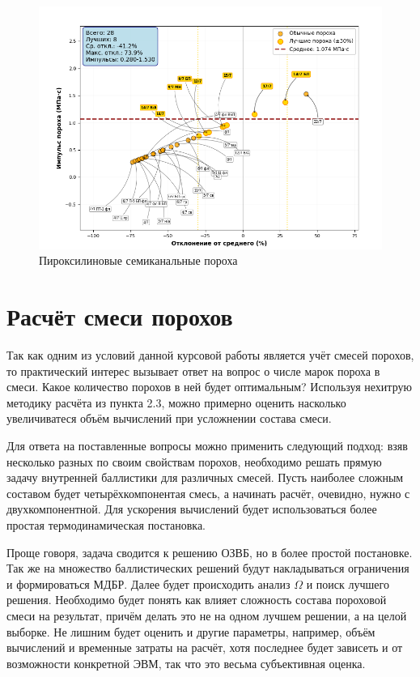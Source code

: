 \documentclass[14pt, a4paper]{extreport} %
\begin{document}
\begin{figure}[H]
\centering
\includegraphics[width=0.6\textheight]{imgs/kaif4.png}
\caption{Пироксилиновые семиканальные пороха}
\end{figure}


\section{Расчёт смеси порохов}

Так как одним из условий данной курсовой работы является учёт смесей порохов, то практический интерес вызывает ответ на вопрос о числе марок пороха в смеси. Какое количество порохов в ней будет оптимальным?
Используя нехитрую методику расчёта из пункта 2.3, можно примерно оценить насколько увеличиватеся объём вычислений при усложнении состава смеси. 

Для ответа на поставленные вопросы можно применить следующий подход: взяв несколько разных по своим свойствам порохов, необходимо решать прямую задачу внутренней баллистики 
для различных смесей. Пусть наиболее сложным составом будет четырёхкомпонентая смесь, а начинать расчёт, очевидно, нужно с двухкомпонентной. Для ускорения вычислений будет использоваться более простая термодинамическая постановка.

Проще говоря, задача сводится к решению ОЗВБ, но в более простой постановке. Так же на множество баллистических решений будут накладываться ограничения и формироваться МДБР. Далее будет происходить 
анализ $\Omega $ и поиск лучшего решения. Необходимо будет понять как влияет сложность состава пороховой смеси на результат, причём делать это не на одном лучшем решении, а на целой выборке. Не лишним будет 
оценить и другие параметры, например, объём вычислений и временные затраты на расчёт, хотя последнее будет зависеть и от возможности конкретной ЭВМ, так что это весьма субъективная оценка.
\end{document}
